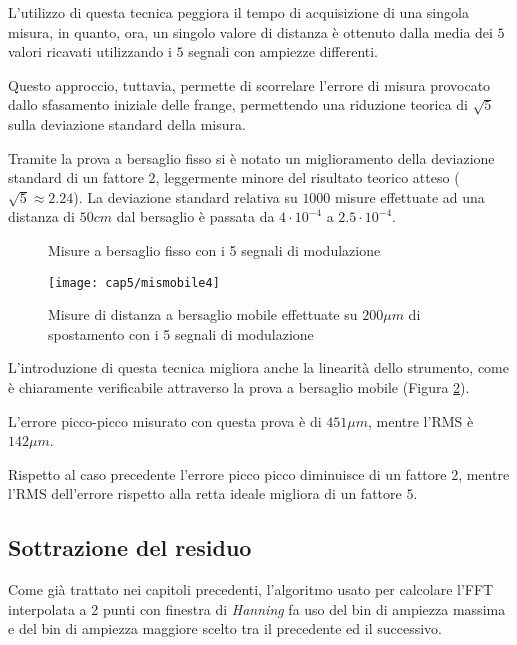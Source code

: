 L'utilizzo di questa tecnica peggiora il tempo di acquisizione di una singola misura, in quanto, ora, un singolo valore di distanza è ottenuto dalla media dei $5$ valori ricavati utilizzando i $5$ segnali con ampiezze differenti.

Questo approccio, tuttavia, permette di scorrelare l'errore di misura provocato dallo sfasamento iniziale delle frange, permettendo una riduzione teorica di $\sqrt{5}$ sulla deviazione standard della misura. 

Tramite la prova a bersaglio fisso si è notato un miglioramento della deviazione standard di un fattore $2$, leggermente minore del risultato teorico atteso ($\sqrt{5} \approx 2.24$). La deviazione standard relativa su $1000$ misure effettuate ad una distanza di $50 cm$ dal bersaglio è passata da $4 \cdot 10^{-4}$ a $2.5 \cdot 10^{-4}$. 

\begin{figure}
\centering
{}
\end{figure}
\begin{figure}
	\centering
{}
\caption{Misure a bersaglio fisso con i 5 segnali di modulazione}\label{misfisso4}
\end{figure}

\begin{figure}  
  \begin{center}
    \texttt{[image: cap5/mismobile4]}
    \caption{Misure di distanza a bersaglio mobile effettuate su $200\mu m$ di spostamento con i 5 segnali di modulazione}
    \label{mismobile4}
  \end{center}
\end{figure}

L'introduzione di questa tecnica migliora anche la linearità dello strumento, come è chiaramente verificabile attraverso la prova a bersaglio mobile (Figura \ref{mismobile4}).

L'errore picco-picco misurato con questa prova è di $451 \mu m$, mentre l'RMS è $142 \mu m$.

Rispetto al caso precedente l'errore picco picco diminuisce di un fattore $2$, mentre l'RMS dell'errore rispetto alla retta ideale migliora di un fattore $5$.

\subsection{Sottrazione del residuo}
Come già trattato nei capitoli precedenti, l'algoritmo usato per calcolare l'FFT interpolata a 2 punti con finestra di \textit{Hanning} fa uso del bin di ampiezza massima e del bin di ampiezza maggiore scelto tra il precedente ed il successivo.

